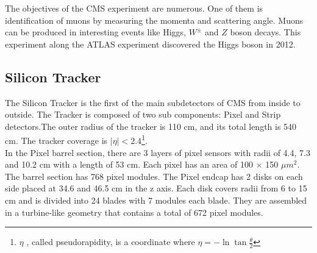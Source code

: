  The objectives of the CMS experiment are numerous. One of them is
identification of muons by measuring the momenta and scattering angle. Muons can be produced in interesting events like Higgs, $W^{\pm}$ and $Z$ boson decays.%
This experiment along the ATLAS experiment discovered the Higgs boson in 2012.
\\


\subsection{Silicon Tracker}
The Silicon Tracker is the first of the main subdetectors of CMS from inside to outside. The Tracker is composed of two sub components: Pixel and  Strip detectors.The outer radius of the  tracker is 110 cm, and its total length is 540 cm. The tracker coverage is $|\eta|<2.4$\footnote{$\eta$ , called pseudorapidity, is a coordinate where $\eta=-\ln{\tan{\frac{\theta}{2}}}$}.\\

In the Pixel barrel section, there are 3 layers of pixel sensors with radii of 4.4, 7.3 and 10.2 cm with a length of 53 cm. Each pixel has an area of 100 $\times$ 150 $\mu m^2$.  The barrel section has 768 pixel modules.
The Pixel endcap has 2 disks on each side placed at 34.6 and 46.5 cm in the z axis. Each disk covers radii from 6 to 15 cm and is divided into 24 blades with 7 modules each blade.
They are assembled in a turbine-like geometry that contains a total of 672 pixel modules. %
\\

